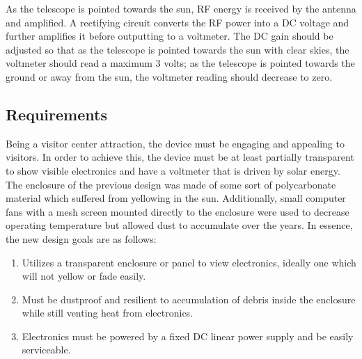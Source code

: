 \documentclass[titlepage]{article}
\begin{document}
As the telescope is pointed towards the sun, RF energy is received by the antenna and amplified. A rectifying circuit converts the RF power into a DC voltage and further amplifies it before outputting to a voltmeter. The DC gain should be adjusted so that as the telescope is pointed towards the sun with clear skies, the voltmeter should read a maximum 3 volts; as the telescope is pointed towards the ground or away from the sun, the voltmeter reading should decrease to zero.

\subsection{Requirements}
Being a visitor center attraction, the device must be engaging and appealing to visitors. In order to achieve this, the device must be at least partially transparent to show visible electronics and have a voltmeter that is driven by solar energy. The enclosure of the previous design was made of some sort of polycarbonate material which suffered from yellowing in the sun. Additionally, small computer fans with a mesh screen mounted directly to the enclosure were used to decrease operating temperature but allowed dust to accumulate over the years. In essence, the new design goals are as follows:
\begin{enumerate}
    \item Utilizes a transparent enclosure or panel to view electronics, ideally one which will not yellow or fade easily.
    \item Must be dustproof and resilient to accumulation of debris inside the enclosure while still venting heat from electronics.
    \item Electronics must be powered by a fixed DC linear power supply and be easily serviceable.
\end{enumerate}
\end{document}
